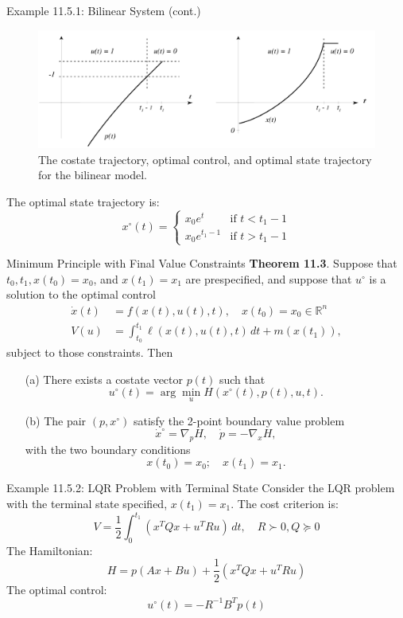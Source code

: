 \documentclass[10pt]{beamer}
\begin{document}
\begin{frame}[fragile]{Example 11.5.1: Bilinear System (cont.)}
  \begin{figure}
    \centering
    \includegraphics[width=1\textwidth]{photos/3.png}
    \caption{The costate trajectory, optimal control, and optimal state trajectory for the bilinear model.}
  \end{figure}
  The optimal state trajectory is:
  \[
  x^\circ(t) = \begin{cases}
  x_0 e^t & \text{if } t < t_1 - 1 \\
  x_0 e^{t_1 - 1} & \text{if } t > t_1 - 1
  \end{cases}
  \]
\end{frame}

\begin{frame}[fragile]{Minimum Principle with Final Value Constraints}
  \textbf{Theorem 11.3}. Suppose that \( t_0, t_1, x(t_0) = x_0 \), and \( x(t_1) = x_1 \) are prespecified, and suppose that \( u^\circ \) is a solution to the optimal control
  \begin{align*}
    \dot{x}(t) &= f(x(t), u(t), t), \quad x(t_0) = x_0 \in \mathbb{R}^n \\
    V(u) &= \int_{t_0}^{t_1} \ell(x(t), u(t), t) \, dt + m(x(t_1)),
  \end{align*}
  subject to those constraints. Then
  \begin{itemize}
      \item[(a)] There exists a costate vector \( p(t) \) such that
      \[
      u^\circ (t) = \arg \min_{u} H(x^\circ (t), p(t), u, t).
      \]
      \item[(b)] The pair \( (p, x^\circ) \) satisfy the 2-point boundary value problem 
      \[
      \dot{x}^\circ = \nabla_p H, \quad \dot{p} = -\nabla_x H,
      \]
      with the two boundary conditions
      \[
      x(t_0) = x_0; \quad x(t_1) = x_1.
      \]
  \end{itemize}
\end{frame}
  
\begin{frame}[fragile]{Example 11.5.2: LQR Problem with Terminal State}
  Consider the LQR problem with the terminal state specified, $x(t_1)=x_1$. The cost criterion is:
  \[
  V = \frac{1}{2} \int_0^{t_1} (x^T Q x + u^T R u) \, dt, \quad R \succ 0, Q \succeq 0
  \]
  The Hamiltonian:
  \[
  H = p (A x + B u) + \frac{1}{2} (x^T Q x + u^T R u)
  \]
  The optimal control:
  \[
  u^\circ(t) = -R^{-1} B^T p(t)
  \]
\end{frame}
  
\end{document}
